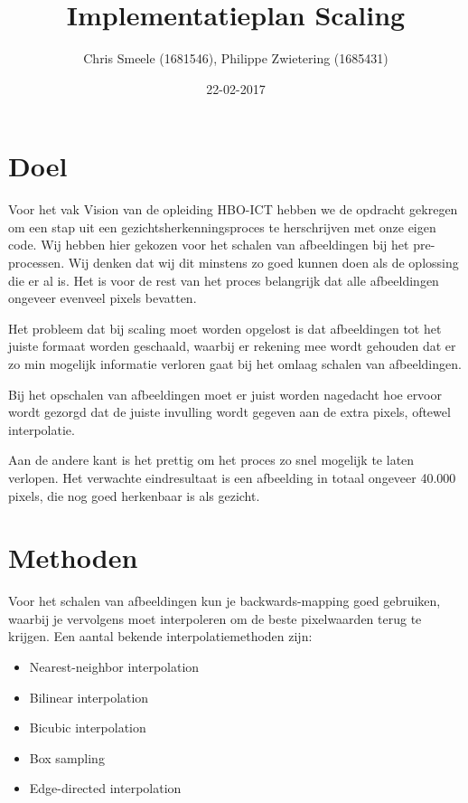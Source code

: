 \documentclass[a4paper]{article}
\author{Chris Smeele (1681546), Philippe Zwietering (1685431)}
\date{22-02-2017}
\title{Implementatieplan Scaling}
\begin{document}
\maketitle
\setcounter{tocdepth}{2}
\tableofcontents


\section{Doel}
\label{sec:org1cd7778}
Voor het vak Vision van de opleiding HBO-ICT hebben we de opdracht
gekregen om een stap uit een gezichtsherkenningsproces te herschrijven
met onze eigen code. Wij hebben hier gekozen voor het schalen van
afbeeldingen bij het pre-processen. Wij denken dat wij dit minstens zo
goed kunnen doen als de oplossing die er al is. Het is voor de rest
van het proces belangrijk dat alle afbeeldingen ongeveer evenveel
pixels bevatten.

Het probleem dat bij scaling moet worden opgelost is dat afbeeldingen
tot het juiste formaat worden geschaald, waarbij er rekening mee wordt
gehouden dat er zo min mogelijk informatie verloren gaat bij het
omlaag schalen van afbeeldingen.

Bij het opschalen van afbeeldingen moet er juist worden nagedacht hoe
ervoor wordt gezorgd dat de juiste invulling wordt gegeven aan de
extra pixels, oftewel interpolatie.

Aan de andere kant is het prettig om het proces zo snel mogelijk te
laten verlopen. Het verwachte eindresultaat is een afbeelding in
totaal ongeveer 40.000 pixels, die nog goed herkenbaar is als gezicht.

\section{Methoden}
\label{sec:org0b4b1ab}

Voor het schalen van afbeeldingen kun je backwards-mapping goed gebruiken, waarbij je vervolgens moet interpoleren om de beste pixelwaarden terug te krijgen. Een aantal bekende interpolatiemethoden zijn:

\begin{itemize}
\item Nearest-neighbor interpolation
\item Bilinear interpolation
\item Bicubic interpolation
\item Box sampling
\item Edge-directed interpolation
\end{itemize}
\end{document}
